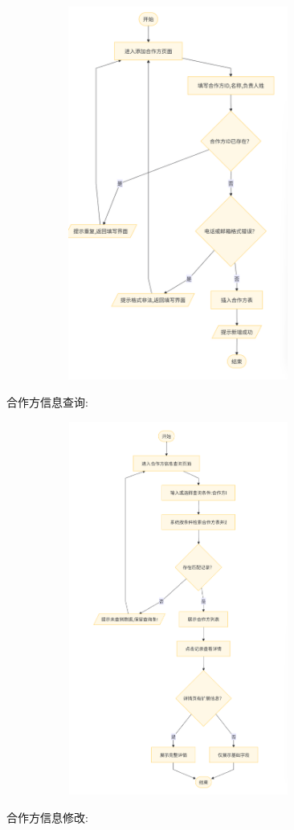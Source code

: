 \documentclass[]{article}
\let\oldincludegraphics\includegraphics
\renewcommand{\includegraphics}[2][]{%
  \begin{center}\oldincludegraphics[#1]{#2}\end{center}%
}
\begin{document}
\includegraphics[width=4.45694in,height=4.83819in]{media/media/image_2-4-1.png}

合作方信息查询:

\includegraphics[width=4.45694in,height=4.83819in]{media/media/image_2-4-2.png}

合作方信息修改:
\end{document}
